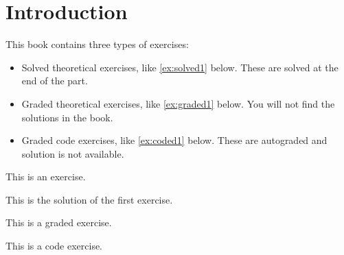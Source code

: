 \section{Introduction}



This book contains three types of exercises:


\begin{itemize}

\item Solved theoretical exercises, like \cref{ex:solved1} below. These are solved at the end of the part.
\item Graded theoretical exercises, like \cref{ex:graded1} below. You will not find the solutions in the book.
\item Graded code exercises, like \cref{ex:coded1} below. These are autograded and solution is not available.
\end{itemize}


\begin{exercise}\label{ex:solved1} This is an exercise. \end{exercise}
\begin{solution}This is the solution of the first exercise. \end{solution}

\begin{gradedexercise}\label{ex:graded1} This is a graded exercise. \end{gradedexercise}

\begin{codeexercise}\label{ex:coded1}
This is a code exercise.
\end{codeexercise}


